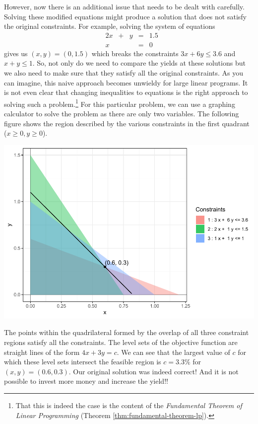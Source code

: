 \documentclass[
]{book}
\theoremstyle{definition}
\theoremstyle{definition}
\theoremstyle{definition}
\theoremstyle{definition}
\theoremstyle{remark}
\begin{document}
However, now there is an additional issue that needs to be dealt with carefully. Solving these modified equations might produce a solution that does not satisfy the original constraints. For example, solving the system of equations
\begin{equation*}
  \begin{array}{rrrrrl}
    & 2x & + & y & = & 1.5 \\
    & x  &  &  & = & 0
  \end{array}
\end{equation*}
gives us \((x, y) = (0, 1.5)\) which breaks the constraints \(3x + 6y \le 3.6\) and \(x + y \le 1\). So, not only do we need to compare the yields at these solutions but we also need to make sure that they satisfy all the original constraints.
As you can imagine, this naive approach becomes unwieldy for large linear programs.
It is not even clear that changing inequalities to equations is the right approach to solving such a problem.\footnote{That this is indeed the case is the content of the \emph{Fundamental Theorem of Linear Programming} (Theorem \ref{thm:fundamental-theorem-lp}).}
For this particular problem, we can use a graphing calculator to solve the problem as there are only two variables.
The following figure shows the region described by the various constraints in the first quadrant (\(x \ge 0, y \ge 0\)).

\includegraphics{Introduction-to-Optimization_files/figure-latex/fig-bond-portfolio-1.pdf}

The points within the quadrilateral formed by the overlap of all three constraint regions satisfy all the constraints. The level sets of the objective function are straight lines of the form \(4x + 3y = c\). We can see that the largest value of \(c\) for which these level sets intersect the feasible region is \(c = 3.3\%\) for \((x, y) = (0.6, 0.3)\).
Our original solution was indeed correct! And it is not possible to invest more money and increase the yield!!
\end{document}
